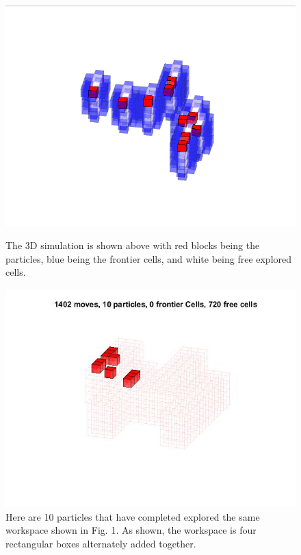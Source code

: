 \documentclass[letterpaper, 10 pt, conference]{ieeeconf}  %
\begin{document}
\begin{figure}
	\vspace{-20pt}
	\includegraphics[height=0.2\paperheight]{3d1.png}
	\caption{The 3D simulation is shown above with red blocks being the particles, blue being the frontier cells, and white being free explored cells.}
	\includegraphics[height=0.2\paperheight]{10particles_720free.jpg}
	\caption{Here are 10 particles that have completed explored the same workspace shown in Fig. 1. As shown, the workspace is four rectangular boxes alternately added together.}

\end{figure}
\end{document}
